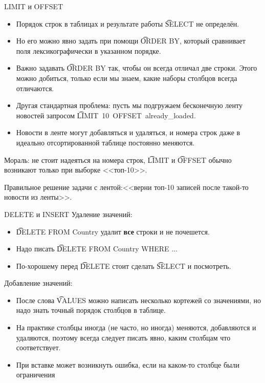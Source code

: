\begin{frame}[t]{LIMIT и OFFSET}
	\begin{itemize}
		\item Порядок строк в таблицах и результате работы \t{SELECT} не определён.
		\item Но его можно явно задать при помощи \t{ORDER BY}, который сравнивает поля лексикографически в указанном порядке.
		\item
			Важно задавать \t{ORDER BY} так, чтобы он всегда отличал две строки.
			Этого можно добиться, только если мы знаем, какие наборы столбцов всегда отличаются.
		\item
			Другая стандартная проблема: пусть мы подгружаем бесконечную ленту новостей
			запросом \t{LIMIT~10~OFFSET~already\_loaded}.
			\pause
		\item
			Новости в ленте могут добавляться и удаляться, и номера строк даже в идеально отсортированной таблице
			постоянно меняются.
	\end{itemize}
	Мораль: не стоит надеяться на номера строк, \t{LIMIT} и \t{OFFSET} обычно возникают только при выборке <<топ-10>>.

	Правильное решение задачи с лентой:\pause <<верни топ-10 записей после такой-то новости из ленты>>.
\end{frame}

\begin{frame}{DELETE и INSERT}
	Удаление значений:
	\begin{itemize}
		\item \t{DELETE FROM Country} удалит \textbf{все} строки и не почешется.
		\item Надо писать \t{DELETE FROM Country WHERE ...}
		\item По-хорошему перед \t{DELETE} стоит сделать \t{SELECT} и посмотреть.
	\end{itemize}
	Добавление значений:
	\begin{itemize}
		\item
			После слова \t{VALUES} можно написать несколько кортежей со значениями,
			но надо знать точный порядок столбцов в таблице.
		\item На практике столбцы иногда (не часто, но иногда) меняются, добавляются и удаляются,
			поэтому всегда следует писать явно, каким столбцам что соответствует.
		\item При вставке может возникнуть ошибка, если на каком-то столбце были ограничения
	\end{itemize}
\end{frame}

